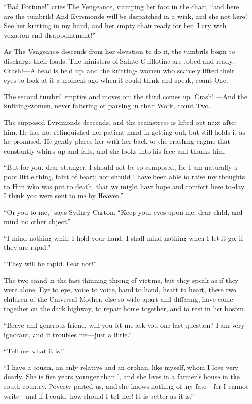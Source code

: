 ``Bad Fortune!'' cries The Vengeance, stamping her foot in the chair,
``and here are the tumbrils!  And Evremonde will be despatched in a
wink, and she not here!  See her knitting in my hand, and her empty
chair ready for her.  I cry with vexation and disappointment!''

As The Vengeance descends from her elevation to do it, the tumbrils
begin to discharge their loads.  The ministers of Sainte Guillotine
are robed and ready.  Crash!---A head is held up, and the knitting-%
women who scarcely lifted their eyes to look at it a moment ago when
it could think and speak, count One.

The second tumbril empties and moves on; the third comes up.  Crash!%
---And the knitting-women, never faltering or pausing in their Work,
count Two.

The supposed Evremonde descends, and the seamstress is lifted out
next after him.  He has not relinquished her patient hand in getting
out, but still holds it as he promised.  He gently places her with
her back to the crashing engine that constantly whirrs up and falls,
and she looks into his face and thanks him.

``But for you, dear stranger, I should not be so composed, for I am
naturally a poor little thing, faint of heart; nor should I have been
able to raise my thoughts to Him who was put to death, that we might
have hope and comfort here to-day.  I think you were sent to me by Heaven.''

``Or you to me,'' says Sydney Carton.  ``Keep your eyes upon me, dear child,
and mind no other object.''

``I mind nothing while I hold your hand.  I shall mind nothing when
I let it go, if they are rapid.''

``They will be rapid.  Fear not!''

The two stand in the fast-thinning throng of victims, but they speak
as if they were alone.  Eye to eye, voice to voice, hand to hand,
heart to heart, these two children of the Universal Mother, else so
wide apart and differing, have come together on the dark highway,
to repair home together, and to rest in her bosom.

``Brave and generous friend, will you let me ask you one last
question?  I am very ignorant, and it troubles me---just a little.''

``Tell me what it is.''

``I have a cousin, an only relative and an orphan, like myself, whom I
love very dearly.  She is five years younger than I, and she lives in
a farmer's house in the south country.  Poverty parted us, and she
knows nothing of my fate---for I cannot write---and if I could, how
should I tell her!  It is better as it is.''

